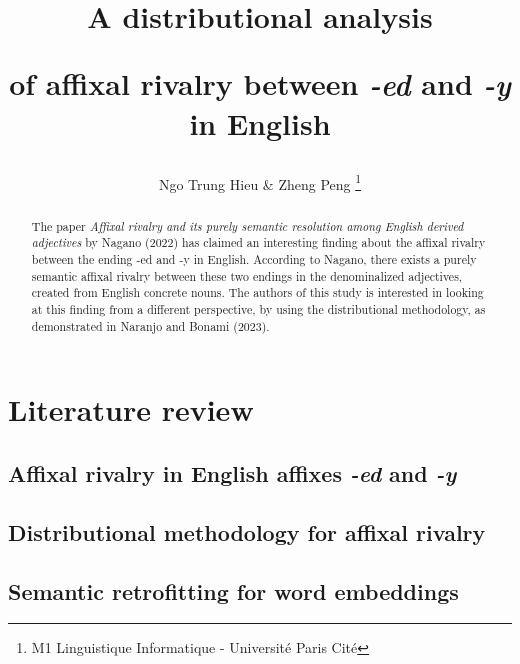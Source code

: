 \documentclass[12pt]{article}
\title{A distributional analysis 

of affixal rivalry between \emph{-ed} and \emph{-y} in English}
\author{Ngo Trung Hieu & Zheng Peng \thanks{M1 Linguistique Informatique - Université Paris Cité}}
\date{}
\begin{document}
\maketitle

\begin{abstract}
    The paper \emph{Affixal rivalry and its purely semantic resolution among English derived adjectives} by Nagano (2022) has claimed an interesting finding about the affixal rivalry between the ending -ed and -y in English. According to Nagano, there exists a purely semantic affixal rivalry between these two endings in the denominalized adjectives, created from English concrete nouns. The authors of this study is interested in looking at this finding from a different perspective, by using the distributional methodology, as demonstrated in Naranjo and Bonami (2023).
\end{abstract}

\section{Literature review}
\subsection{Affixal rivalry in English affixes \emph{-ed} and \emph{-y}}

\subsection{Distributional methodology for affixal rivalry}

\subsection{Semantic retrofitting for word embeddings}
\end{document}
